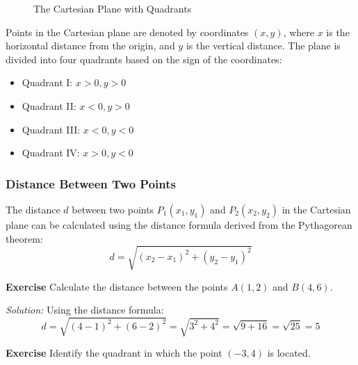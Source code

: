 \documentclass[a4paper,12pt]{book}
\newenvironment{exercise}[1][]
  {\par\medskip\noindent\textbf{Exercise #1} \rmfamily}
  {\medskip}
\newenvironment{solution}[1][]
{\par\noindent\textit{Solution:} \rmfamily}{\medskip}
\begin{document}
\begin{figure}[H]
\centering
{}
\caption{The Cartesian Plane with Quadrants}
\end{figure}

Points in the Cartesian plane are denoted by coordinates \((x, y)\), where \(x\) is the horizontal distance from the origin, and \(y\) is the vertical distance. The plane is divided into four quadrants based on the sign of the coordinates:

\begin{itemize}
\item Quadrant I: \(x > 0, y > 0\)
\item Quadrant II: \(x < 0, y > 0\)
\item Quadrant III: \(x < 0, y < 0\)
\item Quadrant IV: \(x > 0, y < 0\)
\end{itemize}

\subsubsection{Distance Between Two Points}
The distance \(d\) between two points \(P_1(x_1, y_1)\) and \(P_2(x_2, y_2)\) in the Cartesian plane can be calculated using the distance formula derived from the Pythagorean theorem:
\[
d = \sqrt{(x_2 - x_1)^2 + (y_2 - y_1)^2}
\]

\begin{exercise}
Calculate the distance between the points \(A(1, 2)\) and \(B(4, 6)\).
\end{exercise}

\begin{solution}
Using the distance formula:
\[
d = \sqrt{(4 - 1)^2 + (6 - 2)^2} = \sqrt{3^2 + 4^2} = \sqrt{9 + 16} = \sqrt{25} = 5
\]
\end{solution}

\begin{exercise}
Identify the quadrant in which the point \((-3, 4)\) is located.
\end{exercise}
\end{document}
